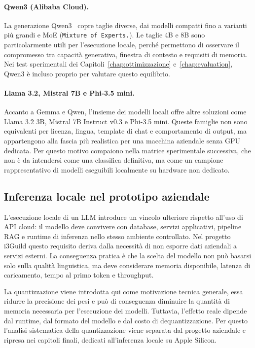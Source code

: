 \paragraph{Qwen3 (Alibaba Cloud).}
La generazione Qwen3~\cite{qwen2025qwen3} copre taglie diverse, dai modelli
compatti fino a varianti più grandi e MoE (\texttt{Mixture of Experts.}). Le
taglie 4B e 8B sono particolarmente utili per l'esecuzione locale, perché
permettono di osservare il compromesso tra capacità generativa, finestra di
contesto e requisiti di memoria. Nei test sperimentali dei
Capitoli~\ref{chap:ottimizzazione} e~\ref{chap:evaluation}, Qwen3 è incluso
proprio per valutare questo equilibrio.

\paragraph{Llama 3.2, Mistral 7B e Phi-3.5 mini.}
Accanto a Gemma e Qwen, l'insieme dei modelli locali offre altre soluzioni come
Llama 3.2 3B, Mistral 7B Instruct v0.3 e Phi-3.5 mini. Queste famiglie non
sono equivalenti per licenza, lingua, template di chat e comportamento di
output, ma appartengono alla fascia più realistica per una macchina aziendale
senza GPU dedicata. Per questo motivo compaiono nella matrice sperimentale
successiva, che non è da intendersi come una classifica definitiva, ma come un campione rappresentativo di
modelli eseguibili localmente su hardware non dedicato.

\subsection{Inferenza locale nel prototipo aziendale}

L'esecuzione locale di un LLM introduce un vincolo ulteriore rispetto all'uso di
API cloud: il modello deve convivere con database, servizi applicativi,
pipeline RAG e runtime di inferenza nello stesso ambiente controllato. Nel
progetto i3Guild questo requisito deriva dalla necessità di non esporre dati
aziendali a servizi esterni. La conseguenza pratica è che la scelta del modello
non può basarsi solo sulla qualità linguistica, ma deve considerare memoria
disponibile, latenza di caricamento, tempo al primo token e throughput.

La quantizzazione viene introdotta qui come motivazione tecnica generale,
essa ridurre la precisione dei pesi e può di conseguenza diminuire la quantità di 
memoria necessaria per l'esecuzione dei modelli. Tuttavia, l'effetto reale dipende
dal runtime, dal formato del modello e dal costo di dequantizzazione. Per questo
l'analisi sistematica della quantizzazione viene separata dal progetto
aziendale e ripresa nei capitoli finali, dedicati all'inferenza locale su Apple
Silicon.

